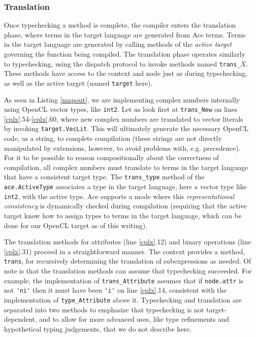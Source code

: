 \documentclass[10pt,preprint]{sigplanconf}
\begin{document}
{%

\subsubsection{Translation}
Once typechecking a method is complete, the compiler enters the translation phase, where terms in the target language are generated from Ace terms. Terms in the target language are generated by calling methods of the \emph{active target} governing the function being compiled. The translation phase operates similarly to typechecking, using the dispatch protocol to invoke methods named \verb|trans_|$X$. These methods have access to the context and node just as during typechecking, as well as the active target (named \verb|target| here).

As seen in Listing \ref{mapout}, we are implementing complex numbers internally using OpenCL vector types, like \verb|int2|. Let us look first at \verb|trans_New| on lines \ref{cplx}.54-\ref{cplx}.60, where new complex numbers are translated to vector literals by invoking \verb|target.VecLit|. This will ultimately  generate the necessary OpenCL code, as a string, to complete compilation (these strings are not directly manipulated by extensions, however, to avoid problems with, e.g. precedence). For it to be possible to reason compositionally about the correctness of compilation, all complex numbers must translate to terms in the target language that have a consistent target type. The \verb|trans_type| method of the \verb|ace.ActiveType| associates a type in the target language, here a vector type like \verb|int2|, with the active type. Ace supports a mode where this \emph{representational consistency} is dynamically checked during compilation (requiring that the active target know how to assign types to terms in the target language, which can be done  for our OpenCL target as of this writing).

The translation methods for attributes (line \ref{cplx}.12) and binary operations  (line \ref{cplx}.31) proceed in a straightforward manner. The context provides a method, \verb|trans|, for recursively determining the translation of subexpressions as needed. Of note is that the translation methods can assume that typechecking succeeded. For example, the implementation of \verb|trans_Attribute| assumes that if \verb|node.attr| is not \verb|'ni'| then it must have been \verb|'i'| on line \ref{cplx}.14, consistent with the implementation of \verb|type_Attribute| above it. Typechecking and translation are separated into two methods to emphasize that typechecking is not target-dependent, and to allow for more advanced uses, like type refinements and hypothetical typing judgements, that we do not describe here.

}
\end{document}
